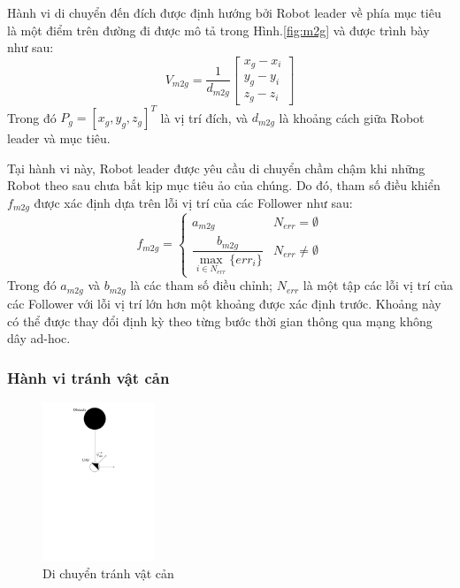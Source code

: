 Hành vi di chuyển đến đích được định hướng bởi Robot leader về phía mục tiêu là một điểm trên đường đi được mô tả trong Hình.\ref{fig:m2g} và được trình bày như sau:
\begin{equation}
    V_{m2g}=\dfrac{1}{d_{m2g}}\left[\begin{array}{c}
    x_{g}-x_i\\
    y_{g}-y_i\\
    z_{g}-z_i
    \end{array}\right]
\end{equation}
Trong đó $P_g=\left[x_g, y_g, z_g\right]^T$ là vị trí đích, và $d_{m2g}$ là khoảng cách giữa Robot leader và mục tiêu.

Tại hành vi này, Robot leader được yêu cầu di chuyển chầm chậm khi những Robot theo sau chưa bắt kịp mục tiêu ảo của chúng. Do đó, tham số điều khiển $f_{m2g}$ được xác định dựa trên lỗi vị trí của các Follower như sau:
\begin{equation}
    f_{m2g}=\left\{\begin{array}{cc}
    a_{m2g} & N_{err}=\emptyset\\
    \dfrac{b_{m2g}}{\max\limits_{i\in N_{err}}\{err_i\}} & N_{err}\neq \emptyset
    \end{array}\right.
\label{eq:m2gp}
\end{equation}
Trong đó $a_{m2g}$ và $b_{m2g}$ là các tham số điều chỉnh; $N_{err}$ là một tập các lỗi vị trí của các Follower với lỗi vị trí lớn hơn một khoảng được xác định trước. Khoảng này có thể được thay đổi định kỳ theo từng bước thời gian thông qua mạng không dây ad-hoc.
 
\subsubsection{Hành vi tránh vật cản}
\begin{figure}[h]
    \centering
    \includegraphics[width = 0.3\textwidth]{chapter3/image/Behavior_obs_cropped.pdf}
    \caption{Di chuyển tránh vật cản}
    \label{fig:bhobs}
\end{figure}

